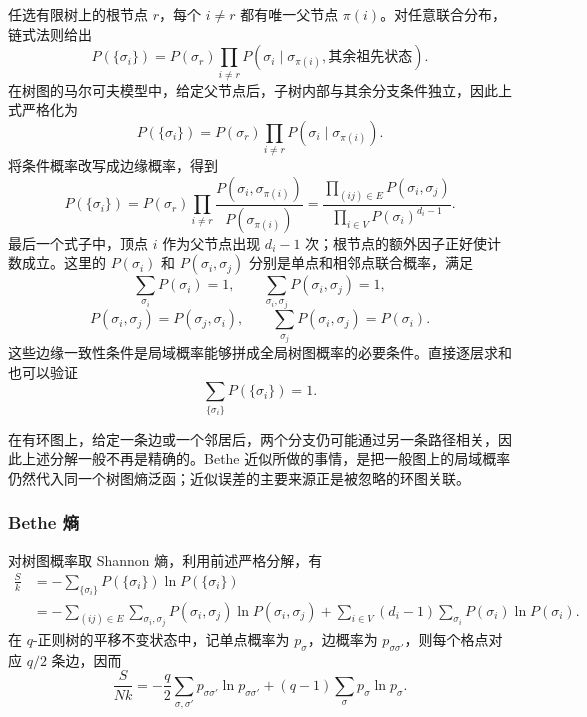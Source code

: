 任选有限树上的根节点 \(r\)，每个 \(i\neq r\) 都有唯一父节点 \(\pi(i)\)。对任意联合分布，链式法则给出
\begin{equation*}
	P(\{\sigma_i\})
	=P(\sigma_r)\prod_{i\neq r}P(\sigma_i\mid \sigma_{\pi(i)},\text{其余祖先状态}).
\end{equation*}
在树图的马尔可夫模型中，给定父节点后，子树内部与其余分支条件独立，因此上式严格化为
\begin{equation*}
	P(\{\sigma_i\})
	=P(\sigma_r)\prod_{i\neq r}P(\sigma_i\mid\sigma_{\pi(i)}).
\end{equation*}
将条件概率改写成边缘概率，得到
\begin{equation*}
	P(\{\sigma_i\})
	=P(\sigma_r)\prod_{i\neq r}
	\frac{P(\sigma_i,\sigma_{\pi(i)})}{P(\sigma_{\pi(i)})}
	=\frac{\displaystyle\prod_{(ij)\in E}P(\sigma_i,\sigma_j)}
	{\displaystyle\prod_{i\in V}P(\sigma_i)^{d_i-1}} .
\end{equation*}
最后一个式子中，顶点 \(i\) 作为父节点出现 \(d_i-1\) 次；根节点的额外因子正好使计数成立。这里的 \(P(\sigma_i)\) 和 \(P(\sigma_i,\sigma_j)\) 分别是单点和相邻点联合概率，满足
\begin{equation*}
	\sum_{\sigma_i}P(\sigma_i)=1,\qquad
	\sum_{\sigma_i,\sigma_j}P(\sigma_i,\sigma_j)=1,
\end{equation*}
\begin{equation*}
	P(\sigma_i,\sigma_j)=P(\sigma_j,\sigma_i),\qquad
	\sum_{\sigma_j}P(\sigma_i,\sigma_j)=P(\sigma_i).
\end{equation*}
这些边缘一致性条件是局域概率能够拼成全局树图概率的必要条件。直接逐层求和也可以验证
\begin{equation*}
	\sum_{\{\sigma_i\}}P(\{\sigma_i\})=1.
\end{equation*}

在有环图上，给定一条边或一个邻居后，两个分支仍可能通过另一条路径相关，因此上述分解一般不再是精确的。Bethe 近似所做的事情，是把一般图上的局域概率仍然代入同一个树图熵泛函；近似误差的主要来源正是被忽略的环图关联。

\subsubsection{Bethe 熵}

对树图概率取 Shannon 熵，利用前述严格分解，有
\begin{align*}
	\frac{S}{k}
	&=-\sum_{\{\sigma_i\}}P(\{\sigma_i\})\ln P(\{\sigma_i\})\\
	&=-\sum_{(ij)\in E}\sum_{\sigma_i,\sigma_j}
	P(\sigma_i,\sigma_j)\ln P(\sigma_i,\sigma_j)
	+\sum_{i\in V}(d_i-1)\sum_{\sigma_i}
	P(\sigma_i)\ln P(\sigma_i).
\end{align*}
在 \(q\)-正则树的平移不变状态中，记单点概率为 \(p_\sigma\)，边概率为 \(p_{\sigma\sigma'}\)，则每个格点对应 \(q/2\) 条边，因而
\begin{equation*}
	\frac{S}{Nk}
	=-\frac q2\sum_{\sigma,\sigma'}p_{\sigma\sigma'}\ln p_{\sigma\sigma'}
	+(q-1)\sum_\sigma p_\sigma\ln p_\sigma .
\end{equation*}

